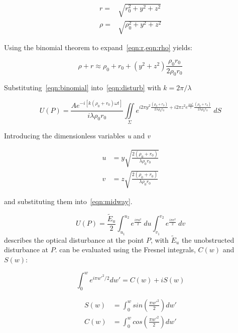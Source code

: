 \begin{align}
r=&\sqrt{r_0^2+y^2+z^2}\label{eqn:r} \\
\rho=&\sqrt{\rho_0^2+y^2+z^2}\label{eqn:rho}
\end{align}

Using the binomial theorem to expand~\cref{eqn:r,eqn:rho} yields:

\begin{equation}
\rho + r \approx \rho_0 + r_0 + (y^2+z^2)\frac{\rho_0r_0}{2\rho_0r_0}
\label{eqn:binomial}
\end{equation}

Substituting~\cref{eqn:binomial} into~\cref{eqn:disturb} with $k=2\pi/\lambda$

\begin{equation}
U(P)=\frac{Ae^{-i[k(\rho_0+r_0)\omega t]}}{i\lambda\rho_0r_0}\iint\limits_{\Sigma} e^{i2\pi y^2\tfrac{(\rho_0+r_0)}{2\lambda\rho_0r_0}+i2\pi z^2e^{\frac{i\pi u^2}{2}}\tfrac{(\rho_0+r_0)}{2\lambda\rho_0r_0}} \ dS
\label{eqn:midway}
\end{equation}


Introducing the dimensionless variables \textit{u} and \textit{v}

\begin{align}
u&=y\sqrt{\frac{2(\rho_0+r_0)}{\lambda\rho_0r_0}}\\
v&=z\sqrt{\frac{2(\rho_0+r_0)}{\lambda\rho_0r_0}}
\end{align}

and substituting them into~\cref{eqn:midway}.

\begin{equation}
U(P)=\frac{\tilde{E}_u}{2}\int_{u_1}^{u_2} e^{\tfrac{i\pi u^2}{2}}\ du\int_{v_1}^{v_2} e^{\tfrac{i\pi v^2}{2}} \ dv
\label{eqn:pentdisturb}
\end{equation}
 describes the optical disturbance at the point $P$, with $\tilde{E}_u$ the unobstructed disturbance at $P$.
 can be evaluated using the Fresnel integrals, $C(w)$ and $S(w)$:


\begin{equation}
\int_{0}^{w}e^{i\pi w'^2/2}dw'=C(w)+iS(w)
\label{eqn:fresneleqn}
\end{equation}


\begin{align}
S(w)&=\int^w_0 sin\left(\frac{\pi w'^2}{2}\right)dw'\label{eqn:fresint1}\\
C(w)&=\int^w_0 cos\left(\frac{\pi w'^2}{2}\right)dw'\label{eqn:fresint2}
\end{align}


